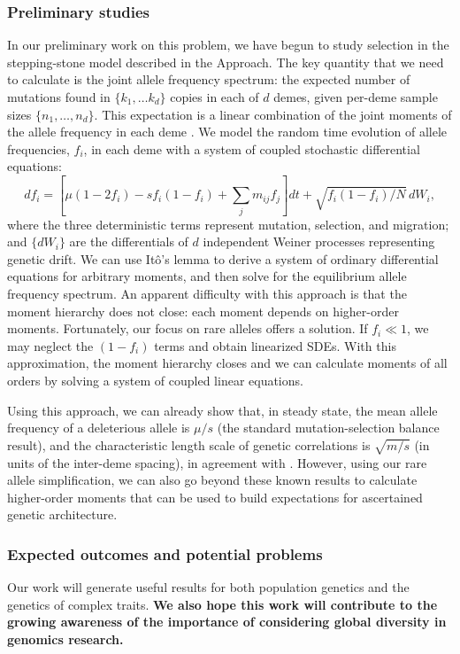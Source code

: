 \documentclass[SpecificAims_and_Proposal]{subfiles}
\begin{document}
\subsubsection*{Preliminary studies}\label{preliminary-studies}

In our preliminary work on this problem, we have begun to study selection in the stepping-stone model described in the Approach.  The key quantity that we need to calculate is the joint allele frequency spectrum:
the expected number of mutations found in $\{k_1, \ldots k_d\}$ copies in each of $d$ demes,
given per-deme sample sizes $\{ n_1, \ldots, n_d \}$.
This expectation is a linear combination of the joint moments of the allele frequency in each deme \cite{Jouganous2017}.
We model the random time evolution of allele frequencies, $f_i$, in each deme
with a system of coupled stochastic differential equations:
\begin{equation}
df_i = [\mu(1-2f_i) - sf_i(1-f_i) + \sum_j m_{ij} f_j]dt + \sqrt{f_i(1-f_i)/N} \,dW_i,
\end{equation}
where the three deterministic terms represent mutation, selection, and migration;
and $\{dW_i\}$ are the differentials of $d$ independent Weiner processes representing genetic drift. We can use It\^{o}'s lemma to derive a system of ordinary differential equations for arbitrary moments,
and then solve for the equilibrium allele frequency spectrum.  An apparent difficulty with this approach is that the moment hierarchy does not close: each moment depends on higher-order moments.
Fortunately, our focus on rare alleles offers a solution. If $f_i \ll 1$, we may neglect the $(1-f_i)$ terms and obtain linearized SDEs. With this approximation, the moment hierarchy closes and we can calculate moments of all orders by solving a system of coupled linear equations.

Using this approach, we can already show that, in steady state, the mean allele frequency of a deleterious allele is $\mu/s$ (the standard mutation-selection balance result),
and the characteristic length scale of genetic correlations is $\sqrt{m/s}$ (in units of the inter-deme spacing), in agreement with \citet{Kimura1964}.
However, using our rare allele simplification, we can also go beyond these known results to calculate higher-order moments that can be used to build expectations for ascertained genetic architecture.

\subsubsection*{Expected outcomes and potential
problems}\label{expected-outcomes-and-potential-problems}
Our work will generate useful results for both population genetics and the genetics of complex traits.  \textbf{We also hope this work will contribute to the growing awareness of the importance of considering global diversity in genomics research.}
\end{document}
